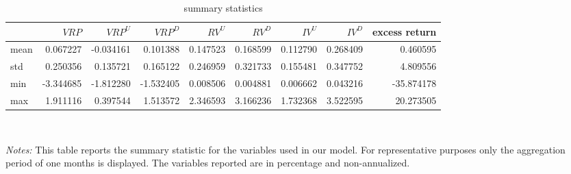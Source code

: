 \documentclass{article}
\begin{document}
\begin{table}[h]
\begin{center}
\caption{summary statistics}
\label{table1}
\begin{tabular}{l|rrr|rr|rr|r}
\toprule
{} &  $VRP$ &  $VRP^{U}$  &   $VRP^{D}$  &   $RV^{U}$ &    $RV^{D}$ &    $IV^{U}$  &          $IV^{D}$ & excess return\\
\midrule
mean  &     0.067227 &    -0.034161 &     0.101388 &     0.147523 &     0.168599 &     0.112790 &     0.268409 &     0.460595 \\
std   &     0.250356 &     0.135721 &     0.165122 &     0.246959 &     0.321733 &     0.155481 &     0.347752 &     4.809556 \\
min   &    -3.344685 &    -1.812280 &    -1.532405 &     0.008506 &     0.004881 &     0.006662 &     0.043216 &   -35.874178 \\
max   &     1.911116 &     0.397544 &     1.513572 &     2.346593 &     3.166236 &     1.732368 &     3.522595 &    20.273505 \\
\bottomrule
\end{tabular}\\
\end{center}
\textit{Notes:} This table reports the summary statistic for the variables used in our model. For representative purposes only the aggregation period of one months is displayed. The variables reported are in percentage and non-annualized.
\end{table}
\end{document}
